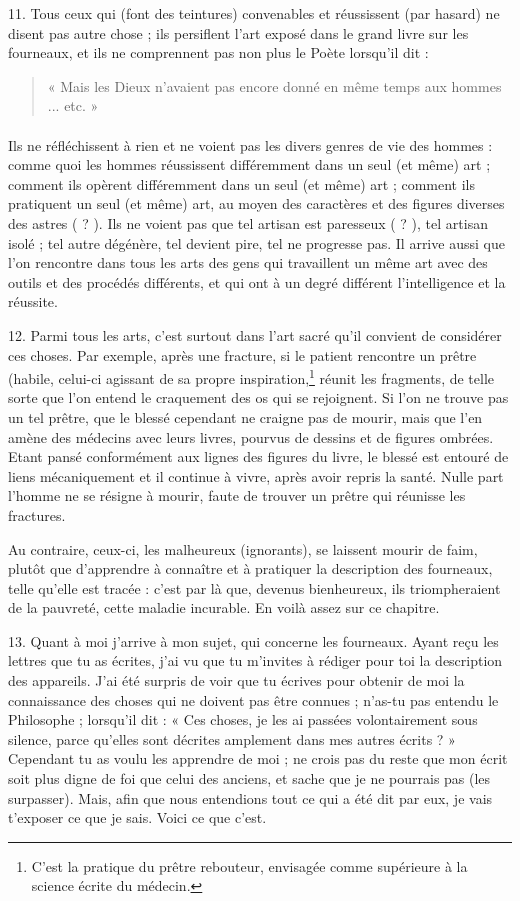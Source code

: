 \documentclass[landscape, a4paper, 11pt, oneside, polutonikogreek, french]{article}
\begin{document}
11. Tous ceux qui (font des teintures) convenables et réussissent (par hasard) ne disent pas autre chose ; ils persiflent l'art exposé dans le grand livre sur les fourneaux, et ils ne comprennent pas non plus le Poète lorsqu'il dit :
\begin{quotation}
« Mais les Dieux n'avaient pas encore donné en même temps aux hommes ... etc. »
\end{quotation}
\paragraph{}
Ils ne réfléchissent à rien et ne voient pas les divers genres de vie des hommes : comme quoi les hommes réussissent différemment dans un seul (et même) art ; comment ils opèrent différemment dans un seul (et même) art ; comment ils pratiquent un seul (et même) art, au moyen des caractères et des figures diverses des astres ( ? ). Ils ne voient pas que tel artisan est paresseux ( ? ), tel artisan isolé ; tel autre dégénère, tel devient pire, tel ne progresse pas. Il arrive aussi que l'on rencontre dans tous les arts des gens qui travaillent un même art avec des outils et des procédés différents, et qui ont à un degré différent l'intelligence et la réussite.

12. Parmi tous les arts, c'est surtout dans l'art sacré qu'il convient de considérer ces choses. Par exemple, après une fracture, si le patient rencontre un prêtre (habile, celui-ci agissant de sa propre inspiration,\footnote{C'est la pratique du prêtre rebouteur, envisagée comme supérieure à la science écrite du médecin.} réunit les fragments, de telle sorte que l'on entend le craquement des os qui se rejoignent. Si l'on ne trouve pas un tel prêtre, que le blessé cependant ne craigne pas de mourir, mais que l'en amène des médecins avec leurs livres, pourvus de dessins et de figures ombrées. Etant pansé conformément aux lignes des figures du livre, le blessé est entouré de liens mécaniquement et il continue à vivre, après avoir repris la santé. Nulle part l'homme ne se résigne à mourir, faute de trouver un prêtre qui réunisse les fractures.

Au contraire, ceux-ci, les malheureux (ignorants), se laissent mourir de faim, plutôt que d'apprendre à connaître et à pratiquer la description des fourneaux, telle qu'elle est tracée : c'est par là que, devenus bienheureux, ils triompheraient de la pauvreté, cette maladie incurable. En voilà assez sur ce chapitre.

13. Quant à moi j'arrive à mon sujet, qui concerne les fourneaux. Ayant reçu les lettres que tu as écrites, j'ai vu que tu m'invites à rédiger pour toi la description des appareils. J'ai été surpris de voir que tu écrives pour obtenir de moi la connaissance des choses qui ne doivent pas être connues ; n'as-tu pas entendu le Philosophe ; lorsqu'il dit : « Ces choses, je les ai passées volontairement sous silence, parce qu'elles sont décrites amplement dans mes autres écrits ? » Cependant tu as voulu les apprendre de moi ; ne crois pas du reste que mon écrit soit plus digne de foi que celui des anciens, et sache que je ne pourrais pas (les surpasser). Mais, afin que nous entendions tout ce qui a été dit par eux, je vais t'exposer ce que je sais. Voici ce que c'est.
\end{document}
